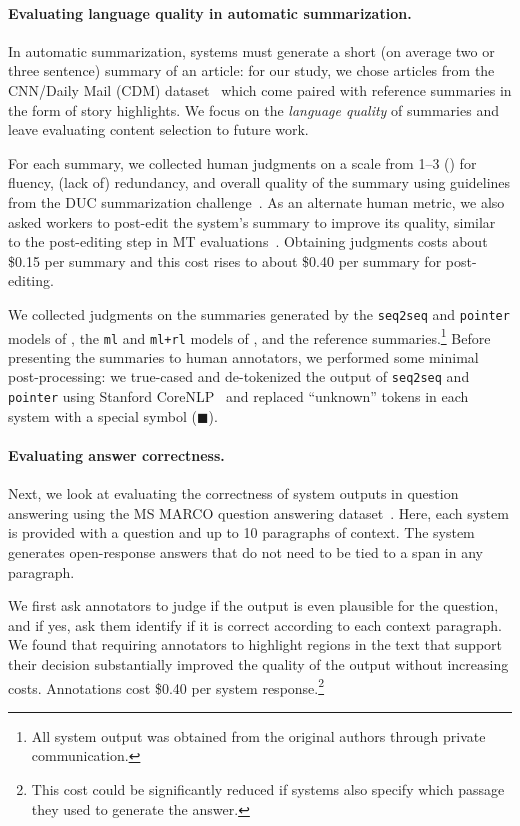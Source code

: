 \paragraph{Evaluating language quality in automatic summarization.}
In automatic summarization, systems must generate a short (on average two or three sentence) summary of an article: for our study, we chose articles from the CNN/Daily Mail (CDM) dataset~\citep{hermann2015read,nallapati2016abstractive} which come paired with reference summaries in the form of story highlights.
We focus on the \textit{language quality} of summaries and leave evaluating content selection to future work.

For each summary, we collected human judgments on a scale from 1--3 () for fluency, (lack of) redundancy, and overall quality of the summary using guidelines from the DUC summarization challenge~\citep{dang2006overview}.
As an alternate human metric, we also asked workers to post-edit the system's summary to improve its quality, similar to the post-editing step in MT evaluations~\citep{snover2006ter}.
Obtaining judgments costs about \$0.15 per summary and this cost rises to about \$0.40 per summary for post-editing.

We collected judgments on the summaries generated by the \texttt{seq2seq} and \texttt{pointer} models of \citet{see2017point}, the \texttt{ml} and \texttt{ml+rl} models of \citet{paulus2018deep}, and the reference summaries.\footnote{%
All system output was obtained from the original authors through private communication.} 
Before presenting the summaries to human annotators, we performed some minimal post-processing: we true-cased and de-tokenized the output of \texttt{seq2seq} and \texttt{pointer} using Stanford CoreNLP~\citep{manning2014stanford} and replaced ``unknown'' tokens in each system with a special symbol ($\blacksquare$).


\paragraph{Evaluating answer correctness.}
Next, we look at evaluating the correctness of system outputs in question answering using the MS MARCO question answering dataset~\citep{nguyen2016ms}.
Here, each system is provided with a question and up to 10 paragraphs of context.
The system generates open-response answers that do not need to be tied to a span in any paragraph.

We first ask annotators to judge if the output is even plausible for the question,
and if yes,
ask them identify if it is correct according to each context paragraph. 
We found that requiring annotators to highlight regions in the text that support their decision
substantially improved the quality of the output without increasing costs.
Annotations cost \$0.40 per system response.\footnote{%
  This cost could be significantly reduced if systems also specify which passage they used to generate the answer.
}

